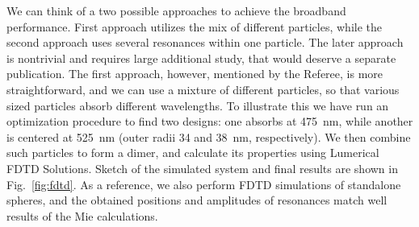 \documentclass[a4paper]{article}
\begin{document}
We can think of a two possible approaches to achieve the broadband
performance. First approach utilizes the mix of different particles,
while the second approach uses several resonances within one
particle. The later approach is nontrivial and requires large
additional study, that would deserve a separate publication. The first
approach, however, mentioned by the Referee, is more straightforward,
and we can use a mixture of different particles, so that various sized
particles absorb different wavelengths.  To illustrate this we have
run an optimization procedure to find two designs: one absorbs at
475~nm, while another is centered at 525~nm (outer radii 34 and 38~nm,
respectively). We then combine such particles to form a dimer, and
calculate its properties using Lumerical FDTD Solutions. Sketch of the
simulated system and final results are shown in
Fig.~\ref{fig:fdtd}. As a reference, we also perform FDTD simulations
of standalone spheres, and the obtained positions and amplitudes of
resonances match well results of the Mie calculations.
\end{document}
